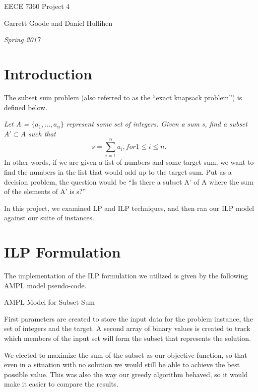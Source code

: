 \documentclass{article}
\begin{document}
\centerline{\sc \large EECE 7360 Project 4}
\vspace{.5pc}
\centerline{\sc Garrett Goode and Daniel Hullihen}
\centerline{\it Spring 2017}

\section{Introduction}
The subset sum problem (also referred to as the ``exact knapsack problem'')
is defined below.

\textit{Let A = $\{a_1, ..., a_n\}$ represent some set of integers. Given a sum s, find a subset $A' \subset A$ such that
  $$s = \sum_{i=1}^n a_i, for 1 \le i \le n.$$}
In other words, if we are given a list of numbers and some target sum, we want
to find the numbers in the list that would add up to the target sum. Put as a decision
problem, the question would be ``Is there a subset A' of A where the sum of the
elements of A' is s?''

In this project, we examined LP and ILP techniques, and then ran our ILP model against our suite of instances.

\section{ILP Formulation}
The implementation of the ILP formulation we utilized is given by the following AMPL model pseudo-code.

\begin{algorithm}
  \caption{AMPL Model for Subset Sum}
  \label{Model}
  \begin{algorithmic}
     
     
    \STATE{}
    \ENSURE{}
    \STATE{}
    \REQUIRE{}
  \end{algorithmic}
\end{algorithm}

First parameters are created to store the input data for the problem instance, the set of integers and 
the target. A second array of binary values is created to track which members of the input set will form 
the subset that represents the solution.

We elected to maximize the sum of the subset as our objective function, so that even in a situation 
with no solution we would still be able to achieve the best possible value. This was also the way our 
greedy algorithm behaved, so it would make it easier to compare the results.
\end{document}
